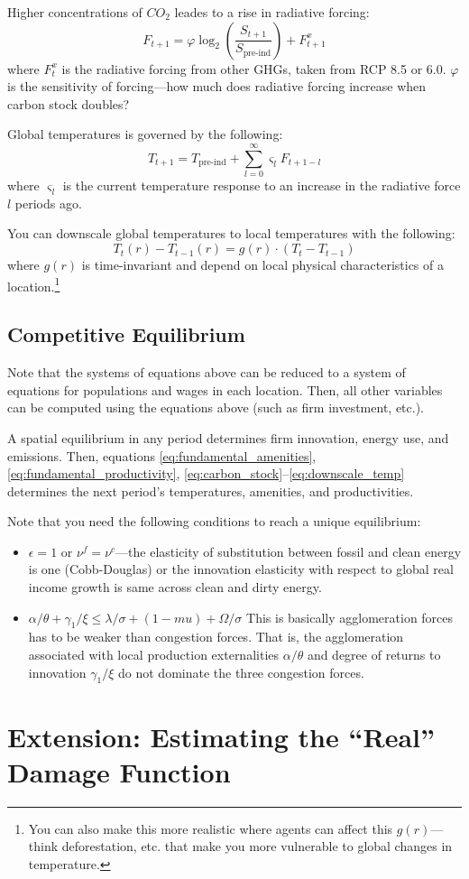 \documentclass[12pt]{amsart}
\begin{document}
Higher concentrations of $CO_2$ leades to a rise in radiative forcing:
\begin{equation}
    F_{t+1} = \varphi \log_2\left(\frac{S_{t+1}}{ S_\text{pre-ind}}\right) + F_{t+1}^x \label{eq:radiative_forcing}
\end{equation}
where $F_t^x$ is the radiative forcing from other GHGs, taken from RCP 8.5 or 6.0. $\varphi$ is the sensitivity of forcing---how much does radiative forcing increase when carbon stock doubles?

Global temperatures is governed by the following:
\begin{equation}
    T_{t+1} = T_\text{pre-ind} + \sum_{l=0}^\infty \varsigma_l F_{t+1-l} \label{eq:global_temp}
\end{equation}
where $\varsigma_l$ is the current temperature response to an increase in the radiative force $l$ periods ago.

You can downscale global temperatures to local temperatures with the following:
\begin{equation}
    T_t(r) - T_{t-1}(r) = g(r) \cdot (T_t - T_{t-1}) \label{eq:downscale_temp}
\end{equation}
where $g(r)$ is time-invariant and depend on local physical characteristics of a location.\footnote{You can also make this more realistic where agents can affect this $g(r)$---think deforestation, etc. that make you more vulnerable to global changes in temperature.}

\subsection{Competitive Equilibrium}

Note that the systems of equations above can be reduced to a system of equations for populations and wages in each location. Then, all other variables can be computed using the equations above (such as firm investment, etc.).

A spatial equilibrium in any period determines firm innovation, energy use, and emissions. Then, equations \ref{eq:fundamental_amenities}, \ref{eq:fundamental_productivity}, \ref{eq:carbon_stock}--\ref{eq:downscale_temp} determines the next period's temperatures, amenities, and productivities.

Note that you need the following conditions to reach a unique equilibrium:
\begin{itemize}
    \item $\epsilon=1$ or $\nu^f = \nu^c$---the elasticity of substitution between fossil and clean energy is one (Cobb-Douglas) or the innovation elasticity with respect to global real income growth is same across clean and dirty energy.
    \item $\alpha / \theta + \gamma_1 / \xi \leq \lambda / \sigma + (1-mu) + \Omega / \sigma$ This is basically agglomeration forces has to be weaker than congestion forces. That is, the agglomeration associated with local production externalities $\alpha/\theta$ and degree of returns to innovation $\gamma_1/\xi$ do not dominate the three congestion forces.
\end{itemize}

\section{Extension: Estimating the ``Real'' Damage Function}

\end{document}
